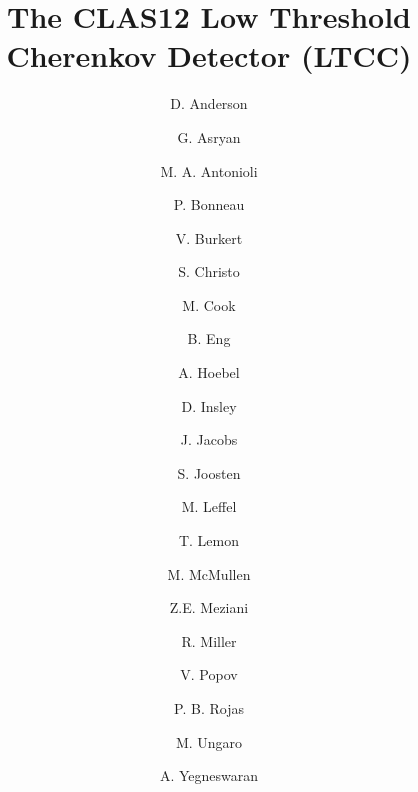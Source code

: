 \title{The CLAS12 Low Threshold Cherenkov Detector (LTCC)}


\author[A]{D. Anderson}     %
\author[A]{G. Asryan}       %
\author[A]{M. A. Antonioli} %
\author[A]{P. Bonneau}      %
\author[A]{V. Burkert}      %
\author[A]{S. Christo}      %
\author[A]{M. Cook}         %
\author[A]{B. Eng}          %
\author[A]{A. Hoebel}       %
\author[A]{D. Insley}       %
\author[A]{J. Jacobs}       %
\author[B]{S. Joosten}      %
\author[A]{M. Leffel}       %
\author[A]{T. Lemon}        %
\author[A]{M. McMullen}     %
\author[B]{Z.E. Meziani}    %
\author[A]{R. Miller}       %
\author[A]{V. Popov}        %
\author[A]{P. B. Rojas}     %
\author[A]{M. Ungaro}       %
\author[A]{A. Yegneswaran}  %


\address[A]{Thomas Jefferson National Accelerator Facility, Newport News, VA, USA}
\address[B]{Temple University, Philadelphia, PA, USA}
